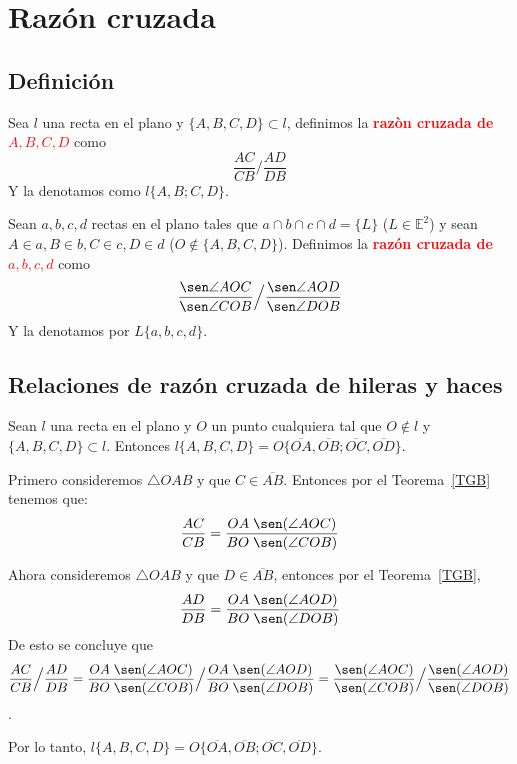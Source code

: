 
\chapter{Razón cruzada}

\section{Definición}
\begin{df}\label{DRC}
Sea $l$ una recta en el plano y $\{A,B,C,D\}\subset l$, definimos la \textcolor{red}{\bf razòn cruzada de $A,B,C,D$} como $$\frac{AC}{CB}\Big/\frac{AD}{DB}$$ Y la denotamos como $l\{A,B;C,D\}$.
\end{df}
\begin{df}
Sean $a,b,c,d$ rectas en el plano tales que $a\cap b\cap c\cap d=\{L\}$ ($L\in\mathbb{E}^{2}$) y sean $A\in a, B\in b, C\in c, D\in d$ ($O\notin\{A,B,C,D\}$). Definimos la \textcolor{red}{\bf razón cruzada de $a,b,c,d$} como $$\frac{\sen\angle AOC}{\sen\angle COB}\Big/\frac{\sen\angle AOD}{\sen\angle DOB}$$ Y la denotamos por $L\{a,b,c,d\}$.
\end{df}
\section{Relaciones de razón cruzada de hileras y haces}
\begin{teo}\label{T1RRC}
Sean $l$ una recta en el plano y $O$ un punto cualquiera tal que $O\notin l$ y $\{A,B,C,D\}\subset l$. Entonces $l\{A,B,C,D\}=O\{\overline{OA},\overline{OB};\overline{OC},\overline{OD}\}$.
\end{teo}
\begin{dem}
Primero consideremos $\triangle OAB$ y que $C\in\overline{AB}$. Entonces por el Teorema~\ref{TGB} tenemos que:
$$\frac{AC}{CB}=\frac{OA\;\sen(\angle AOC)}{BO\;\sen(\angle COB)}$$

Ahora consideremos $\triangle OAB$ y que $D\in\overline{AB}$, entonces por el Teorema~\ref{TGB},
$$\frac{AD}{DB}=\frac{OA\;\sen(\angle AOD)}{BO\;\sen(\angle DOB)}$$
De esto se concluye que 
$$\frac{AC}{CB}\Big/\frac{AD}{DB}=\frac{OA\;\sen(\angle AOC)}{BO\;\sen(\angle COB)}\Big/\frac{OA\;\sen(\angle AOD)}{BO\;\sen(\angle DOB)}=\frac{\sen(\angle AOC)}{\sen(\angle COB)}\Big/\frac{\sen(\angle AOD)}{\sen(\angle DOB)}$$.

Por lo tanto, $l\{A,B,C,D\}=O\{\overline{OA},\overline{OB};\overline{OC},\overline{OD}\}$.

\end{dem}

